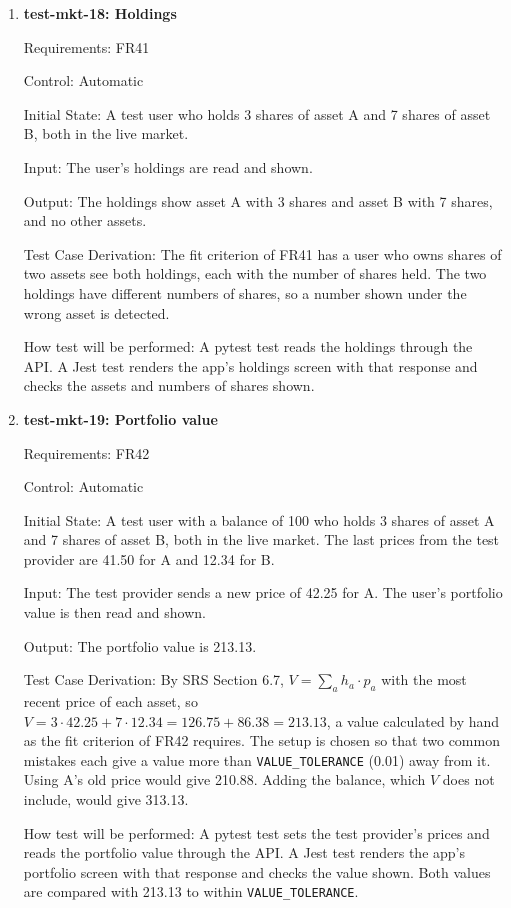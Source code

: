 \documentclass[12pt, titlepage]{article}
\begin{document}
\begin{enumerate}
\item{\textbf{test-mkt-18: Holdings}\\}

Requirements: FR41

Control: Automatic

Initial State: A test user who holds 3 shares of asset A and 7 shares of asset
B, both in the live market.

Input: The user's holdings are read and shown.

Output: The holdings show asset A with 3 shares and asset B with 7 shares, and
no other assets.

Test Case Derivation: The fit criterion of FR41 has a user who owns shares of
two assets see both holdings, each with the number of shares held. The two
holdings have different numbers of shares, so a number shown under the wrong
asset is detected.

How test will be performed: A pytest test reads the holdings through the API.
A Jest test renders the app's holdings screen with that response and checks
the assets and numbers of shares shown.

\item{\textbf{test-mkt-19: Portfolio value}\\}

Requirements: FR42

Control: Automatic

Initial State: A test user with a balance of 100 who holds 3 shares of asset
A and 7 shares of asset B, both in the live market. The last prices from the
test provider are 41.50 for A and 12.34 for B.

Input: The test provider sends a new price of 42.25 for A. The user's
portfolio value is then read and shown.

Output: The portfolio value is 213.13.

Test Case Derivation: By SRS Section 6.7, $V = \sum_a h_a \cdot p_a$ with the
most recent price of each asset, so
$V = 3 \cdot 42.25 + 7 \cdot 12.34 = 126.75 + 86.38 = 213.13$, a value
calculated by hand as the fit criterion of FR42 requires. The setup is chosen
so that two common mistakes each give a value more than
\texttt{VALUE\_TOLERANCE} (0.01) away from it. Using A's old price would give
210.88. Adding the balance, which $V$ does not include, would give 313.13.

How test will be performed: A pytest test sets the test provider's prices and
reads the portfolio value through the API. A Jest test renders the app's
portfolio screen with that response and checks the value shown. Both values
are compared with 213.13 to within \texttt{VALUE\_TOLERANCE}.


\end{enumerate}
\end{document}
